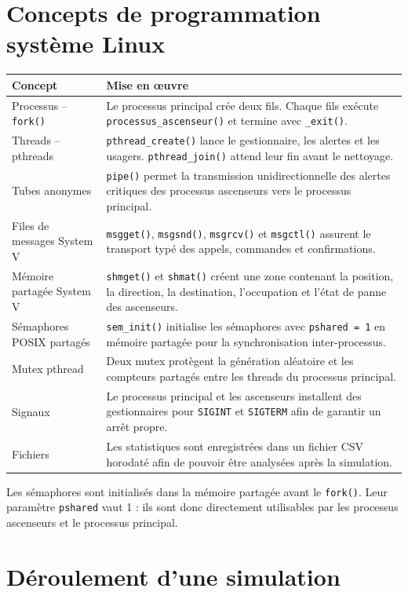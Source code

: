 \documentclass[11pt,a4paper]{article}
\begin{document}
\section{Concepts de programmation système Linux}

\begin{longtable}{p{4.2cm}p{10.2cm}}
\toprule
\textbf{Concept} & \textbf{Mise en œuvre}\\
\midrule
\endhead
Processus -- \texttt{fork()} & Le processus principal crée deux fils. Chaque fils exécute \texttt{processus\_ascenseur()} et termine avec \texttt{\_exit()}.\\
Threads -- pthreads & \texttt{pthread\_create()} lance le gestionnaire, les alertes et les usagers. \texttt{pthread\_join()} attend leur fin avant le nettoyage.\\
Tubes anonymes & \texttt{pipe()} permet la transmission unidirectionnelle des alertes critiques des processus ascenseurs vers le processus principal.\\
Files de messages System V & \texttt{msgget()}, \texttt{msgsnd()}, \texttt{msgrcv()} et \texttt{msgctl()} assurent le transport typé des appels, commandes et confirmations.\\
Mémoire partagée System V & \texttt{shmget()} et \texttt{shmat()} créent une zone contenant la position, la direction, la destination, l'occupation et l'état de panne des ascenseurs.\\
Sémaphores POSIX partagés & \texttt{sem\_init()} initialise les sémaphores avec \texttt{pshared = 1} en mémoire partagée pour la synchronisation inter-processus.\\
Mutex pthread & Deux mutex protègent la génération aléatoire et les compteurs partagés entre les threads du processus principal.\\
Signaux & Le processus principal et les ascenseurs installent des gestionnaires pour \texttt{SIGINT} et \texttt{SIGTERM} afin de garantir un arrêt propre.\\
Fichiers & Les statistiques sont enregistrées dans un fichier CSV horodaté afin de pouvoir être analysées après la simulation.\\
\bottomrule
\end{longtable}

Les sémaphores sont initialisés dans la mémoire partagée avant le \texttt{fork()}. Leur paramètre \texttt{pshared} vaut 1 : ils sont donc directement utilisables par les processus ascenseurs et le processus principal.

\section{Déroulement d'une simulation}
\end{document}
